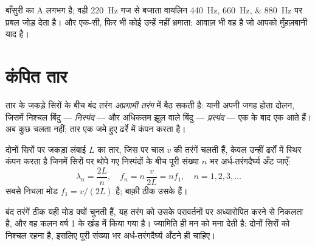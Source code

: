 \begin{example}\label{ex:g12:sound-acoustics:two-instruments}
बाँसुरी का A लगभग  है; वही \qty{220}{Hz} गज से बजाता वायलिन
\qtylist{440;660;880}{Hz} पर प्रबल  जोड़ देता है।
 और  एक-सी, फिर भी कोई उन्हें नहीं भ्रमाता:
आवाज़ भी वह  है जो आपको मुँहज़बानी याद है।
\end{example}

\section{कंपित तार}

\begin{definition}[अप्रगामी तरंग]\label{def:g12:sound-acoustics:standing-wave}
तार के जकड़े सिरों के बीच बंद तरंग \emph{अप्रगामी
तरंग} में बैठ सकती है: यानी अपनी जगह होता दोलन, जिसमें
निश्चल बिंदु --- \emph{निस्पंद} --- और अधिकतम झूल वाले बिंदु
--- \emph{प्रस्पंद} --- एक के बाद एक आते हैं। अब कुछ चलता
नहीं; तार एक जमे हुए ढर्रे में कंपन करता है।
\end{definition}

\begin{proposition}[तार के मोड]\label{prop:g12:sound-acoustics:string-modes}
दोनों सिरों पर जकड़ा लंबाई $L$ का तार, जिस पर चाल $v$ की
तरंगें चलती हैं, केवल उन्हीं ढर्रों में स्थिर कंपन करता है जिनमें
सिरों पर थोपे गए निस्पंदों के बीच पूरी संख्या $n$ भर
अर्ध-तरंगदैर्घ्य अँट जाएँ:
\[ \lambda_n = \frac{2L}{n}, \quad f_n = n\,\frac{v}{2L} = n f_1, \quad n = 1, 2, 3, \dots \]
सबसे निचला मोड $f_1 = v/(2L)$  है; बाक़ी ठीक उसके 
हैं। \admitted
\end{proposition}

\begin{remark}\label{rem:g12:sound-acoustics:honest}
बंद तरंगें ठीक यही मोड क्यों चुनती हैं, यह तरंग को उसके
परावर्तनों पर अध्यारोपित करने से निकलता है, और वह कलन वर्ष 1 के खंड में किया गया है।
ज्यामिति ही मन को मना देती है: दोनों सिरों को निश्चल रहना है, इसलिए पूरी
संख्या भर अर्ध-तरंगदैर्घ्य अँटने ही चाहिए।
\end{remark}

